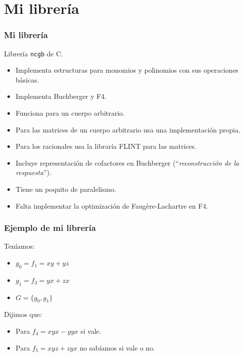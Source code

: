 \documentclass[spanish, aspectratio=169, hidecontrols]{beamer}
\newcommand\cpp{C\nolinebreak[4]\hspace{-.05em}\raisebox{.4ex}{\relsize{-3}{\textbf{++}}}\xspace}
\begin{document}
\section{Mi librería}

\begin{frame}
  \frametitle{Mi librería}
  Librería \texttt{ncgb} de \cpp.
  \pause
  \begin{itemize}
    \item Implementa estructuras para monomios y polinomios con sus operaciones básicas. %
    \pause
    \item Implementa Buchberger y F4.
    \pause
    \item Funciona para un \alert{cuerpo arbitrario}. %
    \pause
    \item Para las matrices de un cuerpo arbitrario usa una implementación propia.
    \pause
    \item Para los racionales usa la libraría FLINT para las matrices. %
    \pause
    \item Incluye \alert{representación de cofactores} en Buchberger (``\textit{reconstrucción de la respuesta}'').
    \pause
    \item Tiene un poquito de paralelismo. %
    \pause
    \item Falta implementar la optimización de Faugère-Lachartre en F4.
  \end{itemize}
\end{frame}

\begin{frame}
  \frametitle{Ejemplo de mi librería}
  \begin{exampleblock}{}
    Teníamos:
    \begin{itemize}
      \item $g_0 = f_1 = xy + yz$
      \item $g_1 = f_3 = yx + zx$
      \item $G = \{g_0, g_1\}$
    \end{itemize}

    Dijimos que:
    \begin{itemize}
      \item Para $f_4 = xyx - yyx$ si vale.
      \item Para $f_5 = xyz + zyx$ no sabíamos si vale o no.
    \end{itemize}
  \end{exampleblock}
\end{frame}
\end{document}
